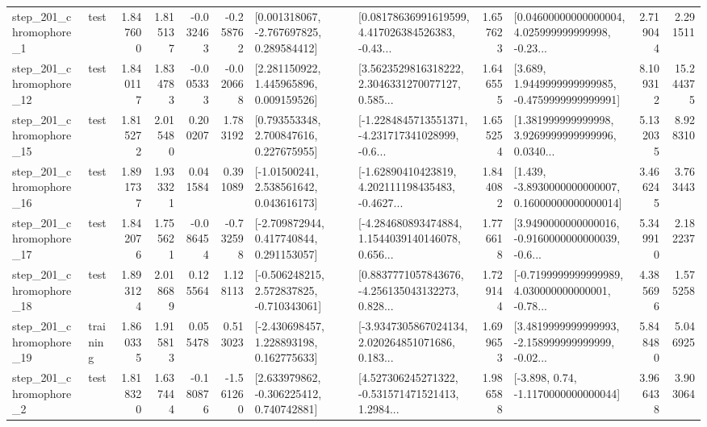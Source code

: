 \begin{tabular}{llrrrrllrlrr}
   step\_201\_chromophore\_1 &      test &      1.847600 &    1.815137 &     -0.032463 & -0.258762 &    [0.001318067, -2.767697825, 0.289584412] &  [0.08178636991619599, 4.417026384526383, -0.43... &       1.657623 &  [0.04600000000000004, 4.025999999999998, -0.23... &            2.719044 &          2.291511 \\
  step\_201\_chromophore\_12 &      test &      1.840117 &    1.834783 &     -0.005333 & -0.020668 &     [2.281150922, 1.445965896, 0.009159526] &  [3.5623529816318222, 2.3046331270077127, 0.585... &       1.646555 &   [3.689, 1.9449999999999985, -0.4759999999999991] &            8.109312 &         15.244375 \\
  step\_201\_chromophore\_15 &      test &      1.815272 &    2.015480 &      0.200207 &  1.783192 &     [0.793553348, 2.700847616, 0.227675955] &  [-1.2284845713551371, -4.231717341028999, -0.6... &       1.655254 &  [1.381999999999998, 3.9269999999999996, 0.0340... &            5.132035 &          8.928310 \\
  step\_201\_chromophore\_16 &      test &      1.891737 &    1.933321 &      0.041584 &  0.391089 &     [-1.01500241, 2.538561642, 0.043616173] &  [-1.62890410423819, 4.202111198435483, -0.4627... &       1.844082 &  [1.439, -3.8930000000000007, 0.16000000000000014] &            3.466245 &          3.763443 \\
  step\_201\_chromophore\_17 &      test &      1.842076 &    1.755621 &     -0.086454 & -0.732598 &    [-2.709872944, 0.417740844, 0.291153057] &  [-4.284680893474884, 1.1544039140146078, 0.656... &       1.776618 &  [3.9490000000000016, -0.9160000000000039, -0.6... &            5.349910 &          2.182237 \\
  step\_201\_chromophore\_18 &      test &      1.893124 &    2.018689 &      0.125564 &  1.128113 &   [-0.506248215, 2.572837825, -0.710343061] &  [0.8837771057843676, -4.256135043132273, 0.828... &       1.729144 &  [-0.7199999999999989, 4.030000000000001, -0.78... &            4.385696 &          1.575258 \\
  step\_201\_chromophore\_19 &  training &      1.860335 &    1.915813 &      0.055478 &  0.513023 &    [-2.430698457, 1.228893198, 0.162775633] &  [-3.9347305867024134, 2.020264851071686, 0.183... &       1.699653 &  [3.4819999999999993, -2.158999999999999, -0.02... &            5.848480 &          5.046925 \\
   step\_201\_chromophore\_2 &      test &      1.818320 &    1.637444 &     -0.180876 & -1.561260 &    [2.633979862, -0.306225412, 0.740742881] &  [4.527306245271322, -0.531571471521413, 1.2984... &       1.986588 &                [-3.898, 0.74, -1.1170000000000044] &            3.966438 &          3.903064 \\

\end{tabular}
